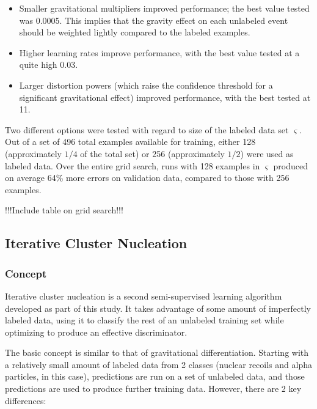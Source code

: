 \documentclass[10pt]{article}
\begin{document}
\begin{itemize}
    \item Smaller gravitational multipliers improved performance; the best value tested was 0.0005. This implies that the gravity effect on each unlabeled event should be weighted lightly compared to the labeled examples.
    \item Higher learning rates improve performance, with the best value tested at a quite high 0.03.
    \item Larger distortion powers (which raise the confidence threshold for a significant gravitational effect) improved performance, with the best tested at 11.
\end{itemize}

Two different options were tested with regard to size of the labeled data set $\varsigma$. Out of a set of 496 total examples available for training, either 128 (approximately $1/4$ of the total set) or 256 (approximately $1/2$) were used as labeled data. Over the entire grid search, runs with 128 examples in $\varsigma$ produced on average 64\% more errors on validation data, compared to those with 256 examples.

!!!Include table on grid search!!!

\subsection{Iterative Cluster Nucleation}

\subsubsection{Concept}

Iterative cluster nucleation is a second semi-supervised learning algorithm developed as part of this study. It takes advantage of some amount of imperfectly labeled data, using it to classify the rest of an unlabeled training set while optimizing to produce an effective discriminator.

The basic concept is similar to that of gravitational differentiation. Starting with a relatively small amount of labeled data from 2 classes (nuclear recoils and alpha particles, in this case), predictions are run on a set of unlabeled data, and those predictions are used to produce further training data. However, there are 2 key differences:
\end{document}
